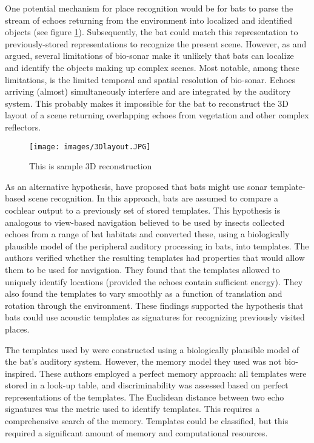 \documentclass[11pt]{report}
\begin{document}
One potential mechanism for place recognition would be for bats to parse the stream of echoes returning from the environment \cite[e.g.,][]{Yovel2009,Vanderelst2016} into localized and identified objects (see figure \ref{fig:3Dlayout}). Subsequently, the bat could match this representation to previously-stored representations to recognize the present scene. However, as \citet{Vanderelst2016} and \citet{Vanderelst2017} argued, several limitations of bio-sonar make it unlikely that bats can localize and identify the objects making up complex scenes. Most notable, among these limitations, is the limited temporal and spatial resolution of bio-sonar. Echoes arriving (almost) simultaneously interfere and are integrated by the auditory system. This probably makes it impossible for the bat to reconstruct the 3D layout of a scene returning overlapping echoes from vegetation and other complex reflectors.

\begin{figure}
    \texttt{[image: images/3Dlayout.JPG]}
    \caption{This is sample 3D reconstruction}
    \label{fig:3Dlayout}
\end{figure}

As an alternative hypothesis, \citet{Vanderelst2016} have proposed that bats might use sonar template-based scene recognition. In this approach, bats are assumed to compare a cochlear output to a previously set of stored templates. This hypothesis is analogous to view-based navigation believed to be used by insects \citep{Zeil2003} \citet{Vanderelst2016} collected echoes from a range of bat habitats and converted these, using a biologically plausible model of the peripheral auditory processing in bats, into templates. The authors verified whether the resulting templates had properties that would allow them to be used for navigation. They found that the templates allowed to uniquely identify locations (provided the echoes contain sufficient energy). They also found the templates to vary smoothly as a function of translation and rotation through the environment. These findings supported the hypothesis that bats could use acoustic templates as signatures for recognizing previously visited places.

The templates used by \citet{Vanderelst2016} were constructed using a biologically plausible model of the bat's auditory system. However, the memory model they used was not bio-inspired. These authors employed a perfect memory approach: all templates were stored in a look-up table, and discriminability was assessed based on perfect representations of the templates. The Euclidean distance between two echo signatures was the metric used to identify templates. This requires a comprehensive search of the memory. Templates could be classified, but this required a significant amount of memory and computational resources. 
\end{document}

